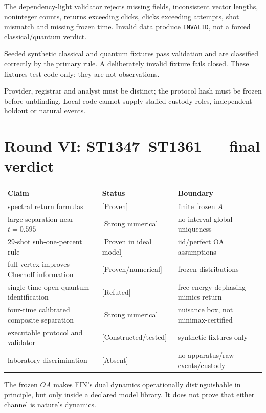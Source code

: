 \documentclass[11pt,a4paper]{article}
\newcommand{\status}[1]{\textsf{[#1]}}
\begin{document}
The dependency-light validator rejects missing fields, inconsistent vector
lengths, noninteger counts, returns exceeding clicks, clicks exceeding attempts,
shot mismatch and missing frozen time.  Invalid data produce \texttt{INVALID},
not a forced classical/quantum verdict.

Seeded synthetic classical and quantum fixtures pass validation and are
classified correctly by the primary rule.  A deliberately invalid fixture
fails closed.  These fixtures test code only; they are not observations.

Provider, registrar and analyst must be distinct; the protocol hash must be
frozen before unblinding.  Local code cannot supply staffed custody roles,
independent holdout or natural events.

\section{Round VI: ST1347--ST1361 --- final verdict}

\begin{longtable}{@{}p{}p{}p{}@{}}
\toprule
Claim & Status & Boundary \\
\midrule\endhead
spectral return formulas & \status{Proven} & finite frozen $A$ \\
large separation near $t=0.595$ & \status{Strong numerical} & no interval global uniqueness \\
29-shot sub-one-percent rule & \status{Proven in ideal model} & iid/perfect OA assumptions \\
full vertex improves Chernoff information & \status{Proven/numerical} & frozen distributions \\
single-time open-quantum identification & \status{Refuted} & free energy dephasing mimics return \\
four-time calibrated composite separation & \status{Strong numerical} & nuisance box, not minimax-certified \\
executable protocol and validator & \status{Constructed/tested} & synthetic fixtures only \\
laboratory discrimination & \status{Absent} & no apparatus/raw events/custody \\
\bottomrule
\end{longtable}

The frozen $OA$ makes FIN's dual dynamics operationally distinguishable in
principle, but only inside a declared model library.  It does not prove that
either channel is nature's dynamics.
\end{document}
